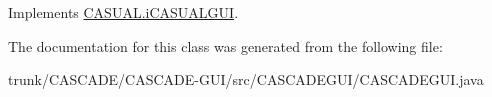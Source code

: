 Implements \hyperlink{interfaceCASUAL_1_1iCASUALGUI_aca8a0966823e8e2c2c8fdb88d20c73bb}{C\-A\-S\-U\-A\-L.\-i\-C\-A\-S\-U\-A\-L\-G\-U\-I}.



The documentation for this class was generated from the following file\-:\begin{DoxyCompactItemize}
\item 
trunk/\-C\-A\-S\-C\-A\-D\-E/\-C\-A\-S\-C\-A\-D\-E-\/\-G\-U\-I/src/\-C\-A\-S\-C\-A\-D\-E\-G\-U\-I/C\-A\-S\-C\-A\-D\-E\-G\-U\-I.\-java\end{DoxyCompactItemize}
